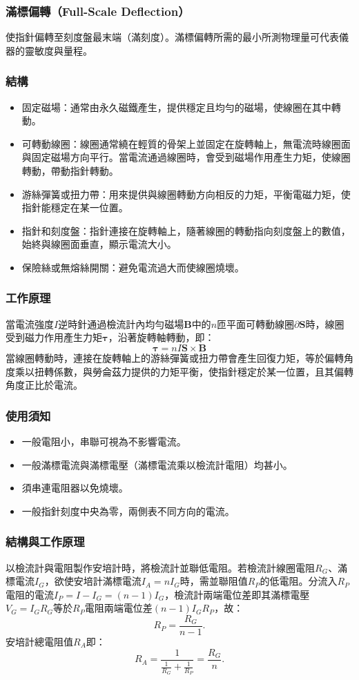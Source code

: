 \documentclass[a4paper,12pt]{report}
\begin{document}
\begin{itemize}
\subsubsection{滿標偏轉（Full-Scale Deflection）}
使指針偏轉至刻度盤最末端（滿刻度）。滿標偏轉所需的最小所測物理量可代表儀器的靈敏度與量程。
\subsubsection{結構}
\begin{itemize}
\item 固定磁場：通常由永久磁鐵產生，提供穩定且均勻的磁場，使線圈在其中轉動。
\item 可轉動線圈：線圈通常繞在輕質的骨架上並固定在旋轉軸上，無電流時線圈面與固定磁場方向平行。當電流通過線圈時，會受到磁場作用產生力矩，使線圈轉動，帶動指針轉動。
\item 游絲彈簧或扭力帶：用來提供與線圈轉動方向相反的力矩，平衡電磁力矩，使指針能穩定在某一位置。
\item 指針和刻度盤：指針連接在旋轉軸上，隨著線圈的轉動指向刻度盤上的數值，始終與線圈面垂直，顯示電流大小。
\item 保險絲或無熔絲開關：避免電流過大而使線圈燒壞。
\end{itemize}
\subsubsection{工作原理}
當電流強度$I$逆時針通過檢流計內均勻磁場$\mathbf{B}$中的$n$匝平面可轉動線圈$\partial\mathbf{S}$時，線圈受到磁力作用產生力矩$\boldsymbol{\tau}$，沿著旋轉軸轉動，即：
\[\boldsymbol{\tau} = nI\mathbf{S}\times\mathbf{B}\]
當線圈轉動時，連接在旋轉軸上的游絲彈簧或扭力帶會產生回復力矩，等於偏轉角度乘以扭轉係數，與勞侖茲力提供的力矩平衡，使指針穩定於某一位置，且其偏轉角度正比於電流。
\subsubsection{使用須知}
\begin{itemize}
\item 一般電阻小，串聯可視為不影響電流。
\item 一般滿標電流與滿標電壓（滿標電流乘以檢流計電阻）均甚小。
\item 須串連電阻器以免燒壞。
\item 一般指針刻度中央為零，兩側表不同方向的電流。
\end{itemize}
\subsubsection{結構與工作原理}
以檢流計與電阻製作安培計時，將檢流計並聯低電阻。若檢流計線圈電阻$R_G$、滿標電流$I_G$，欲使安培計滿標電流$I_A=nI_G$時，需並聯阻值$R_P$的低電阻。分流入$R_P$電阻的電流$I_P=I-I_G=(n-1)I_G$，檢流計兩端電位差即其滿標電壓$V_G=I_GR_G$等於$R_P$電阻兩端電位差$(n-1)I_GR_P$，故：
\[R_P=\frac{R_G}{n-1}.\]
安培計總電阻值$R_A$即：
\[R_A=\frac{1}{\frac{1}{R_G}+\frac{1}{R_P}}=\frac{R_G}{n}.\]

\end{itemize}
\end{document}
